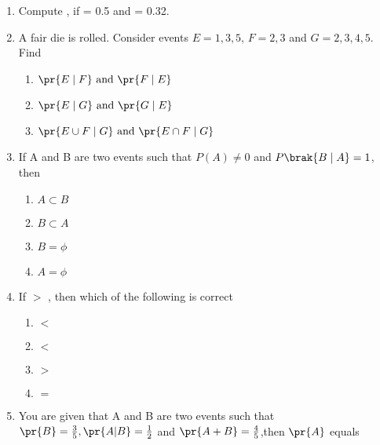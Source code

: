 \begin{enumerate}[label=\thesection.\arabic*,ref=\thesection.\theenumi]
\begin{enumerate}
\item {} \item {}
\end{enumerate}
\solution
%
\item Compute  , if  = 0.5 and  = 0.32.\\
	\solution
\item A fair die is rolled. Consider events $E=1,3,5,\, F=2,3$ and $G=2,3,4,5$. Find
\begin{enumerate}
\item $\pr{E \mid F} \text{ and } \pr{F \mid E}$
\item $\pr{E \mid G} \text{ and } \pr{G \mid E}$
\item $\pr{{E \cup F} \mid G} \text{ and } \pr{{E \cap F} \mid G}$
\end{enumerate}
%
\solution
%
	\item If A and B are two events such that $P(A) \neq 0$ and $P\brak{B\mid A} = 1$, then
\begin{enumerate}
\item $A \subset B$\\
\item $B\subset A$\\
\item $B = \phi$\\
\item $A = \phi$\\
\end{enumerate}
		\solution
	\item If  $>$ , then which of the following is correct 
\begin{enumerate}
 \item {} $<$  \\
 \item {} $<$     \\
 \item {} $>$  \label{eq:ncert/12/13/6/18/c}\\ 
 \item {} $=$  \\
\end{enumerate}
		\solution
\item You are given that A and B are two events such that $\pr{B}=\frac{3}{5},\pr{A|B}=\frac{1}{2}$ and $\pr{A+B}=\frac{4}{5}$,then $\pr{A}$ equals\\

\end{enumerate}
